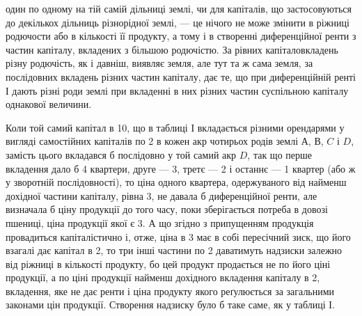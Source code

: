 \parcont{}  %
один по одному на тій самій дільниці землі, чи для капіталів, що застосовуються
до декількох дільниць різнорідної землі, — це нічого не може змінити в ріжниці
родючости або в кількості її продукту, а тому і в створенні диференційної
ренти з частин капіталу, вкладених з більшою родючістю. За рівних капіталовкладень
різну родючість, як і давніш, виявляє земля, але тут та ж сама земля,
за послідовних вкладень різних частин капіталу, дає те, що при диференційній
ренті І дають різні роди землі при вкладенні в них різних частин суспільною
капіталу однакової величини.

Коли той самий капітал в 10, що в таблиці І вкладається різними орендарями
у вигляді самостійних капіталів по 2 в кожен акр чотирьох родів
землі $А$, $В$, $C$ і $D$, замість цього вкладався б послідовно у той самий акр
$D$, так що перше вкладення дало б 4 квартери, друге — 3, третє — 2 і останнє
— 1 квартер (або ж у зворотній послідовності), то ціна одного квартера, одержуваного
від найменш дохідної частини капіталу, рівна 3, не давала б диференційної
ренти, але визначала б ціну продукції до того часу, поки зберігається
потреба в довозі пшениці, ціна продукції якої є 3. А що згідно з припущенням
продукція провадиться капіталістично і, отже, ціна в 3 має
в собі пересічний зиск, що його взагалі дає капітал в 2, то три інші
частини по 2 даватимуть надзиски залежно від ріжниці в кількості
продукту, бо цей продукт продається не по його ціні продукції, а по ціні продукції
найменш дохідного вкладення капіталу в 2, вкладення, яке не дає ренти
і ціна продукту якого реґулюється за загальними законами цін продукції. Створення
надзиску було б таке саме, як у таблиці І.

